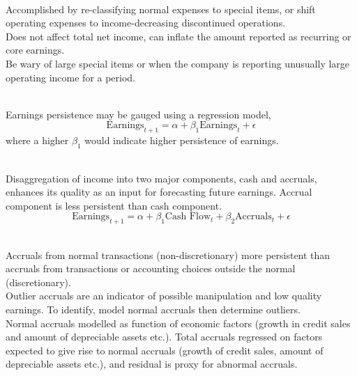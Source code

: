 \begin{definition} \\
Accomplished by re-classifying normal expenses to special items, or shift operating expenses to income-decreasing discontinued operations. \\
Does not affect total net income, can inflate the amount reported as recurring or core earnings.\\
Be wary of large special items or when the company is reporting unusually large operating income for a period. 
\end{definition}

\begin{remark} \\
Earnings persistence may be gauged using a regression model,
\begin{equation}
\text{Earnings}_{t+1} = \alpha + \beta_1 \text{Earnings}_t + \epsilon \nonumber
\end{equation}
where a higher $\beta_1$ would indicate higher persistence of earnings.
\end{remark}

\begin{method} \\
Disaggregation of income into two major components, cash and accruals, enhances its quality as an input for forecasting future earnings. Accrual component is less persistent than cash component.
\begin{equation}
\text{Earnings}_{t+1} = \alpha + \beta_1 \text{Cash Flow}_t + \beta_2 \text{Accruals}_t  + \epsilon \nonumber
\end{equation}
\end{method}

\begin{remark} \\
Accruals from normal transactions (non-discretionary) more persistent than accruals from transactions or accounting choices outside the normal (discretionary).\\
Outlier accruals are an indicator of possible manipulation and low quality earnings. To identify, model normal accruals then determine outliers.\\
Normal accruals modelled as function of economic factors (growth in credit sales and amount of depreciable assets etc.). Total accruals regressed on factors expected to give rise to normal accruals (growth of credit sales, amount of depreciable assets etc.), and residual is proxy for abnormal accruals.
\end{remark}

